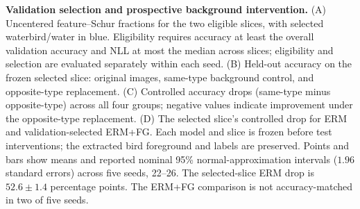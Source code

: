 \textbf{Validation selection and prospective background intervention.}
(A) Uncentered feature--Schur fractions for the two eligible slices, with selected waterbird/water in blue. Eligibility requires accuracy at least the overall validation accuracy and NLL at most the median across slices; eligibility and selection are evaluated separately within each seed. (B) Held-out accuracy on the frozen selected slice: original images, same-type background control, and opposite-type replacement. (C) Controlled accuracy drops (same-type minus opposite-type) across all four groups; negative values indicate improvement under the opposite-type replacement. (D) The selected slice's controlled drop for ERM and validation-selected ERM+FG. Each model and slice is frozen before test interventions; the extracted bird foreground and labels are preserved. Points and bars show means and reported nominal 95\% normal-approximation intervals ($1.96$ standard errors) across five seeds, 22--26. The selected-slice ERM drop is $52.6\pm1.4$ percentage points. The ERM+FG comparison is not accuracy-matched in two of five seeds.
